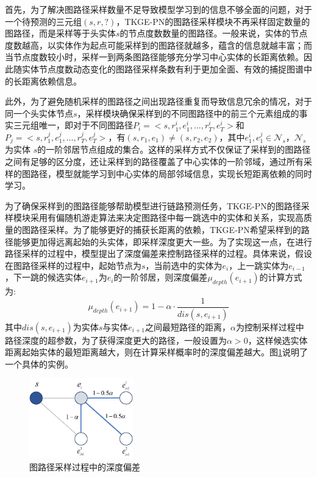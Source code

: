 首先，为了解决图路径采样数量不足导致模型学习到的信息不够全面的问题，对于一个待预测的三元组$(s,r,?)$，TKGE-PN的图路径采样模块不再采样固定数量的图路径，而是采样等于头实体$s$的节点度数数量的图路径。一般来说，实体的节点度数越高，以实体作为起点可能采样到的图路径就越多，蕴含的信息就越丰富；而当节点度数较小时，采样一到两条图路径能够充分学习中心实体的长距离依赖。因此随实体节点度数动态变化的图路径采样条数有利于更加全面、有效的捕捉图谱中的长距离依赖信息。

此外，为了避免随机采样的图路径之间出现路径重复而导致信息冗余的情况，对于同一个头实体节点$s$，采样模块确保采样到的不同图路径中的前三个元素组成的事实三元组唯一，即对于不同图路径$P_i=<s,r_1^{i},e_1^{i},...,r_T^{i},e_T^{i}>$和$P_j=<s,r_1^{j},e_1^{j},...,r_T^{j},e_T^{j}>$，有$(s, r_1, e_1)\neq(s, r_2, e_2)$，其中$e_1^{i},e_1^{j}\in \mathcal{N}_s$，$\mathcal{N}_s$为实体 $s$的一阶邻居节点组成的集合。这样的采样方式不仅保证了采样到的图路径之间有足够的区分度，还让采样到的路径覆盖了中心实体的一阶邻域，通过所有采样的图路径，模型就能学习到中心实体的局部邻域信息，实现长短距离依赖的同时学习。

为了确保采样到的图路径能够帮助模型进行链路预测任务，TKGE-PN的图路径采样模块采用有偏随机游走算法来决定图路径中每一跳选中的实体和关系，实现高质量的图路径采样。为了能够更好的捕获长距离的依赖，TKGE-PN希望采样到的路径能够更加得远离起始的头实体，即采样深度更大一些。为了实现这一点，在进行路径采样的过程中，模型提出了深度偏差来控制路径采样的过程。具体来说，假设在图路径采样的过程中，起始节点为$s$，当前选中的实体为$e_i$，上一跳实体为$e_{i-1}$，下一跳的候选实体$e_{i+1}$为$e_i$的一阶邻居，则深度偏差$\mu_{depth}(e_{i+1})$的计算方式为:
\begin{equation}
  \mu_{depth}(e_{i+1})=1-\alpha\cdot\frac{1}{dis(s,e_{i+1})}
\end{equation}
其中$dis(s,e_{i+1})$为实体$s$与实体$e_{i+1}$之间最短路径的距离，$\alpha$为控制采样过程中路径深度的超参数，为了获得深度更大的路径，一般设置为$\alpha>0$，这样候选实体距离起始实体的最短距离越大，则在计算采样概率时的深度偏差越大。图\ref{depth_bias}说明了一个具体的实例。

\begin{figure}[htbp]
  \centerline{\includegraphics[width=0.4\textwidth]{pic/depth_bias.pdf}}
  \caption{图路径采样过程中的深度偏差}
  \label{depth_bias}
\end{figure}


